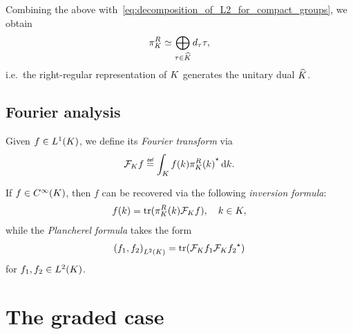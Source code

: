 Combining the above with~\eqref{eq:decomposition_of_L2_for_compact_groups},
we obtain
\begin{align*}
    \RightRegularRepresentation \simeq \bigoplus_{\tau \in \dualGroup \CompactGroup} \dimRep \tau \tau,
\end{align*}
i.e.\ the right-regular representation of $\CompactGroup$ generates the unitary dual $\dualGroup \CompactGroup$.

\subsection{Fourier analysis}

Given $f \in \Lebesgue 1 \CompactGroup$,
we define its \emph{Fourier transform} via
\begin{align*}
    \Fourier [\CompactGroup] f \defeq \int_\CompactGroup f(k) \adj{\RightRegularRepresentation(k)} \dd k.
\end{align*}

If $f \in \SmoothFunctions \CompactGroup$,
then $f$ can be recovered via the following \emph{inversion formula}:
\begin{align*}
    f(k) = \tr(\RightRegularRepresentation(k) \Fourier [\CompactGroup] f),
    \quad k \in \CompactGroup,
\end{align*}
while the \emph{Plancherel formula} takes the form
\begin{align*}
    \ip [\Lebesgue 2 \CompactGroup] {f_1} {f_2}
    = \tr(\Fourier [\CompactGroup] f_1 \adj{\Fourier [\CompactGroup] f_2})
\end{align*}
for $f_1, f_2 \in \Lebesgue 2 \CompactGroup$.

\section{The graded case}
